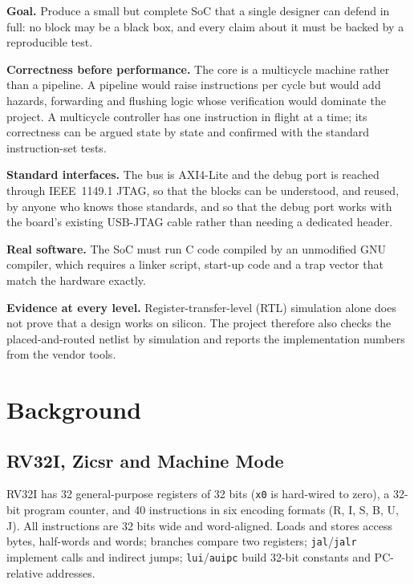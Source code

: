 \documentclass[journal,10pt]{IEEEtran}
\newcommand{\reg}[1]{\texttt{#1}}
\begin{document}
\textbf{Goal.} Produce a small but complete SoC that a single designer can
defend in full: no block may be a black box, and every claim about it must be
backed by a reproducible test.

\textbf{Correctness before performance.} The core is a multicycle machine
rather than a pipeline. A pipeline would raise instructions per cycle but
would add hazards, forwarding and flushing logic whose verification would
dominate the project. A multicycle controller has one instruction in flight
at a time; its correctness can be argued state by state and confirmed with
the standard instruction-set tests.

\textbf{Standard interfaces.} The bus is AXI4-Lite and the debug port is
reached through IEEE~1149.1 JTAG, so that the blocks can be understood, and
reused, by anyone who knows those standards, and so that the debug port works
with the board's existing USB-JTAG cable rather than needing a dedicated
header.

\textbf{Real software.} The SoC must run C code compiled by an unmodified GNU
compiler, which requires a linker script, start-up code and a trap vector
that match the hardware exactly.

\textbf{Evidence at every level.} Register-transfer-level (RTL) simulation
alone does not prove that a design works on silicon. The project therefore
also checks the placed-and-routed netlist by simulation and reports the
implementation numbers from the vendor tools.

\section{Background}\label{sec:background}
\subsection{RV32I, Zicsr and Machine Mode}
RV32I \cite{riscv-unpriv} has 32 general-purpose registers of 32 bits
(\reg{x0} is hard-wired to zero), a 32-bit program counter, and 40
instructions in six encoding formats (R, I, S, B, U, J). All instructions
are 32 bits wide and word-aligned. Loads and stores access bytes, half-words
and words; branches compare two registers; \reg{jal}/\reg{jalr} implement
calls and indirect jumps; \reg{lui}/\reg{auipc} build 32-bit constants and
PC-relative addresses.
\end{document}
